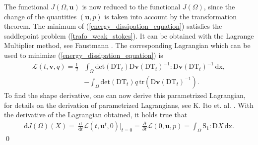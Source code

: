 \begin{proof*}
The functional $J(\Omega,\mathbf{u})$ is now reduced to the functional $J(\Omega)$, since the change of the quantities $(\mathbf{u},p)$
is taken into account by the transformation theorem. The minimum of (\ref{energy_dissipation_equation})
satisfies the saddlepoint problem (\ref{trafo_weak_stokes}). It can be obtained with the Lagrange Multiplier method, 
see Faustmann \cite{lecture_notes_faustmann_numPDE}. The corresponding Lagrangian which can be used to minimize (\ref{energy_dissipation_equation})
is
\begin{equation}\label{parametrized_lagrangian}
 \begin{aligned}
	\mathcal{L}(t,\mathbf{v}, q) = \frac{1}{2}& \int_{\Omega} \mathrm{det}(\mathrm{DT}_t) \mathrm{D} \mathbf{v}(\mathrm{DT}_t)^{-1} :
	\mathrm{D} \mathbf{v}(\mathrm{DT}_t)^{-1} \, \mathrm{dx}, \\
	&- \int_{\Omega}\mathrm{det}(\mathrm{DT}_t)q \, \mathrm{tr} \left( \mathrm{D}\mathbf{v}(\mathrm{DT}_t)^{-1} \right).
\end{aligned}
\end{equation}
To find the shape derivative, one can now derive this parametrized Lagrangian, for details on the derivation of parametrized Lagrangians, 
see K. Ito et. al. \cite{lagrangian_derivative}. With the derivative of the Lagrangian obtained, it holds true that
\begin{align}
	\mathrm{d}J(\Omega)(X) =\ \frac{\mathrm{d}}{\mathrm{d}t} \mathcal{L}(t, \mathbf{u}^t, 0)\big\rvert_{t=0}  =
	\frac{\partial}{\partial t}\mathcal{L}(0,\mathbf{u},p) = \int_{\Omega} \mathrm{S}_1 : \mathrm{D}X \, \mathrm{dx}.
\end{align}
\qed
\end{proof*}

